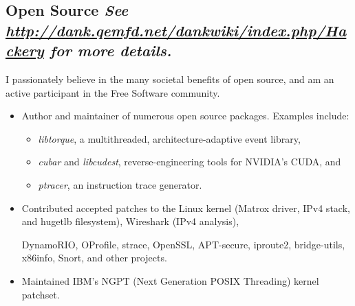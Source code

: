 \documentclass{article}
\newenvironment{tightitemize}
{\begin{itemize}
  \setlength{\itemsep}{1pt}
  \setlength{\parskip}{0pt}
  \setlength{\parsep}{0pt}}
{\end{itemize}}
\begin{document}
\subsection*{Open Source \hfill\tiny\textit{See \href{http://dank.qemfd.net/dankwiki/index.php/Hackery}{http://dank.qemfd.net/dankwiki/index.php/Hackery} for more details.}}
I passionately believe in the many societal benefits of open source, and am an active
participant in the Free Software community.
\begin{tightitemize}
\item Author and maintainer of numerous open source packages. Examples include:
\begin{tightitemize}
\item \textit{libtorque}, a multithreaded, architecture-adaptive event library,
\item \textit{cubar} and \textit{libcudest}, reverse-engineering tools for NVIDIA's CUDA, and
\item \textit{ptracer}, an instruction trace generator.
\end{tightitemize}
\item Contributed accepted patches to
the Linux kernel (Matrox driver, IPv4 stack, and hugetlb filesystem), 
Wireshark (IPv4 analysis),

{\indent} DynamoRIO, OProfile,
  strace, OpenSSL, APT-secure, iproute2, bridge-utils, x86info, Snort, and other projects.
\item Maintained IBM's NGPT (Next Generation POSIX Threading) kernel patchset.
\end{tightitemize}

\vspace{2mm}
\end{document}
